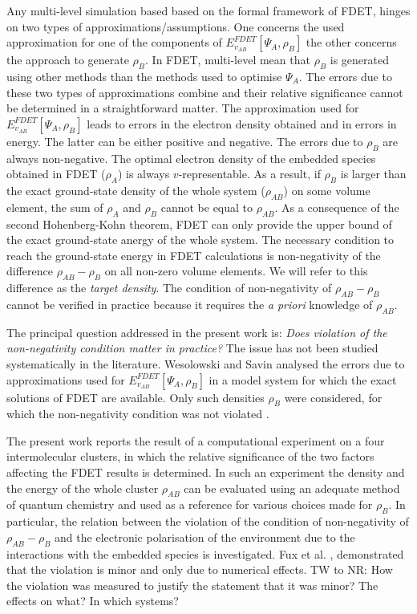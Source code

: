 \documentclass[journal=jctcce,manuscript=article]{achemso}
\begin{document}
Any multi-level simulation based based on the formal framework of FDET, hinges on two types of approximations/assumptions.
One concerns the used approximation for one of the components of ${E}_{v_{AB}}^{FDET}[\Psi_{A},\rho_B]$ the other concerns the approach to generate $\rho_B$. In FDET, multi-level mean that  $\rho_B$ is generated using other methods than the methods used to optimise $\Psi_A$. The errors due to these two types of approximations combine and their relative significance cannot be determined  in a straightforward matter. The approximation used for ${E}_{v_{AB}}^{FDET}[\Psi_{A},\rho_B]$ leads to errors in the electron density obtained and in errors in energy. The latter can be either positive and negative. The errors due to  $\rho_B$ are always non-negative.
The optimal electron density of the embedded species obtained in FDET ($\rho_A$) is always $v$-representable. 
As a result, if $\rho_B$
is larger than the exact ground-state density of the whole system ($\rho_{AB}$) on some volume element, the sum of $\rho_A$ and
$\rho_B$ cannot be equal to $\rho_{AB}$. As a consequence of the second Hohenberg-Kohn theorem, FDET can only provide the upper bound of the exact ground-state anergy of the whole system. The necessary condition to reach the ground-state energy in FDET calculations is non-negativity of the difference $\rho_{AB}-\rho_B$ on all non-zero volume elements.
We will refer to this difference as the {\it target density}.
The condition of non-negativity of $\rho_{AB}-\rho_B$ cannot be verified in practice because it requires the {\it a priori} knowledge of 
$\rho_{AB}$.

The principal question addressed in the present work is:  {\it Does violation of the non-negativity condition matter in practice?}  
The issue has not been studied systematically in the literature.
Wesolowski and Savin analysed the errors due to approximations used for ${E}_{v_{AB}}^{FDET}[\Psi_{A},\rho_B]$ in a model system for which the exact solutions of FDET are available. Only such densities $\rho_B$  were considered, for which the non-negativity condition was not violated  \cite{Wesolowski2013}. 

The present work reports the result of a computational experiment on a four intermolecular clusters, in which the relative significance 
of the two factors affecting the FDET results is determined. In such an experiment the density and the energy of the whole cluster $\rho_{AB}$ can be evaluated using an adequate method of quantum chemistry and used as a reference for various choices made for $\rho_B$.
In particular, the relation between the violation of the condition of non-negativity of  $\rho_{AB}-\rho_B$  and the electronic polarisation of the environment due to the interactions with the embedded species is investigated.
Fux et al. \cite{Fux2010}, demonstrated that the violation  is minor and only due to numerical effects.
{\color{red}TW to NR: How the violation was measured to justify the statement that it was minor? The effects on what? In which systems? } 
\end{document}
